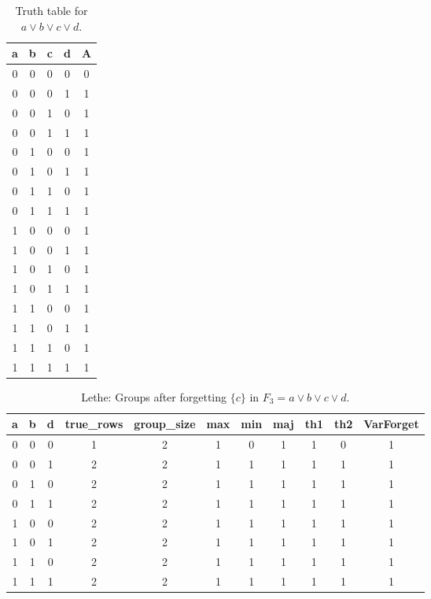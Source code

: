 \begin{table}[!tb]
    \centering
    \begin{tabular}{|c|c|c|c|c|}
        \hline
        \textbf{a} & \textbf{b} & \textbf{c} & \textbf{d} & \textbf{A} \\ \hline
        0 & 0 & 0 & 0 & 0 \\ \hline
        0 & 0 & 0 & 1 & 1 \\ \hline
        0 & 0 & 1 & 0 & 1 \\ \hline
        0 & 0 & 1 & 1 & 1 \\ \hline
        0 & 1 & 0 & 0 & 1 \\ \hline
        0 & 1 & 0 & 1 & 1 \\ \hline
        0 & 1 & 1 & 0 & 1 \\ \hline
        0 & 1 & 1 & 1 & 1 \\ \hline
        1 & 0 & 0 & 0 & 1 \\ \hline
        1 & 0 & 0 & 1 & 1 \\ \hline
        1 & 0 & 1 & 0 & 1 \\ \hline
        1 & 0 & 1 & 1 & 1 \\ \hline
        1 & 1 & 0 & 0 & 1 \\ \hline
        1 & 1 & 0 & 1 & 1 \\ \hline
        1 & 1 & 1 & 0 & 1 \\ \hline
        1 & 1 & 1 & 1 & 1 \\ \hline
    \end{tabular}
    \caption{Truth table for $a \lor b \lor c \lor d$.}
    \label{tab:truthtab}
\end{table}

\begin{table}[!tb]
    \centering
    \begin{tabular}{|c|c|c|c|c|c|c|c|c|c|c|}
        \hline
        \textbf{a} & \textbf{b} & \textbf{d} & \textbf{true\_rows} & \textbf{group\_size} & \textbf{max} & \textbf{min} & \textbf{maj} & \textbf{th1} & \textbf{th2} & \textbf{VarForget} \\ \hline
        \rowcolor{gray!40} 0 & 0 & 0 & 1 & 2 & 1 & 0 & 1 & 1 & 0 & 1 \\ \hline
        \rowcolor{blue!40} 0 & 0 & 1 & 2 & 2 & 1 & 1 & 1 & 1 & 1 & 1 \\ \hline
        \rowcolor{red!40} 0 & 1 & 0 & 2 & 2 & 1 & 1 & 1 & 1 & 1 & 1 \\ \hline
        \rowcolor{green!40} 0 & 1 & 1 & 2 & 2 & 1 & 1 & 1 & 1 & 1 & 1 \\ \hline
        \rowcolor{yellow!40} 1 & 0 & 0 & 2 & 2 & 1 & 1 & 1 & 1 & 1 & 1 \\ \hline
        \rowcolor{gray!40} 1 & 0 & 1 & 2 & 2 & 1 & 1 & 1 & 1 & 1 & 1 \\ \hline
        \rowcolor{blue!40} 1 & 1 & 0 & 2 & 2 & 1 & 1 & 1 & 1 & 1 & 1 \\ \hline
        \rowcolor{red!40} 1 & 1 & 1 & 2 & 2 & 1 & 1 & 1 & 1 & 1 & 1 \\ \hline
    \end{tabular}
    \caption{Lethe: Groups after forgetting $\{c\}$ in $F_{3} = a \lor b \lor c \lor d$.}
    \label{tab:lethe-F3-c-groups}
\end{table}
